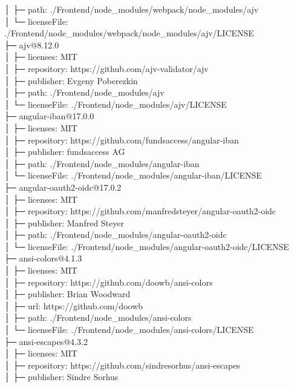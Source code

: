 │  ├─ path: ./Frontend/node\_modules/webpack/node\_modules/ajv\\
│  └─ licenseFile: ./Frontend/node\_modules/webpack/node\_modules/ajv/LICENSE\\
├─ ajv@8.12.0\\
│  ├─ licenses: MIT\\
│  ├─ repository: https://github.com/ajv-validator/ajv\\
│  ├─ publisher: Evgeny Poberezkin\\
│  ├─ path: ./Frontend/node\_modules/ajv\\
│  └─ licenseFile: ./Frontend/node\_modules/ajv/LICENSE\\
├─ angular-iban@17.0.0\\
│  ├─ licenses: MIT\\
│  ├─ repository: https://github.com/fundsaccess/angular-iban\\
│  ├─ publisher: fundsaccess AG\\
│  ├─ path: ./Frontend/node\_modules/angular-iban\\
│  └─ licenseFile: ./Frontend/node\_modules/angular-iban/LICENSE\\
├─ angular-oauth2-oidc@17.0.2\\
│  ├─ licenses: MIT\\
│  ├─ repository: https://github.com/manfredsteyer/angular-oauth2-oidc\\
│  ├─ publisher: Manfred Steyer\\
│  ├─ path: ./Frontend/node\_modules/angular-oauth2-oidc\\
│  └─ licenseFile: ./Frontend/node\_modules/angular-oauth2-oidc/LICENSE\\
├─ ansi-colors@4.1.3\\
│  ├─ licenses: MIT\\
│  ├─ repository: https://github.com/doowb/ansi-colors\\
│  ├─ publisher: Brian Woodward\\
│  ├─ url: https://github.com/doowb\\
│  ├─ path: ./Frontend/node\_modules/ansi-colors\\
│  └─ licenseFile: ./Frontend/node\_modules/ansi-colors/LICENSE\\
├─ ansi-escapes@4.3.2\\
│  ├─ licenses: MIT\\
│  ├─ repository: https://github.com/sindresorhus/ansi-escapes\\
│  ├─ publisher: Sindre Sorhus\\
